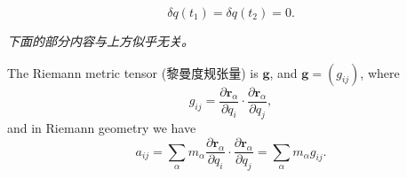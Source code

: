 \[\delta q(t_1) = \delta q(t_2) = 0.\]

\emph{下面的部分内容与上方似乎无关。}

The Riemann metric tensor (黎曼度规张量) is \(\mathbf{g}\), and
\(\mathbf{g} = (g_{ij})\), where
\[g_{ij} = \dfrac{\partial \boldsymbol{r}_\alpha}{\partial q_i} \cdot \dfrac{\partial \boldsymbol{r}_\alpha}{\partial q_j},\]
and in Riemann geometry we have
\[a_{ij} = \sum_{\alpha} m_\alpha \dfrac{\partial \boldsymbol{r}_\alpha}{\partial q_i} \cdot \dfrac{\partial \boldsymbol{r}_\alpha}{\partial q_j} = \sum_{\alpha} m_\alpha g_{ij}.\]
